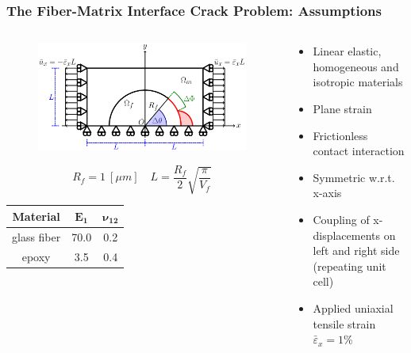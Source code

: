 \documentclass[first,firstsupp,lastsupp,last,hyperref,table]{ETHclass}
\begin{document}
\begin{frame}
\frametitle{\vspace{0.3cm}\small The Fiber-Matrix Interface Crack Problem: Assumptions}
\vspace{-1.cm}
\centering
\begin{columns}
\begin{column}{0.6\textwidth}
\begin{figure}
\includegraphics[width=0.95\columnwidth]{RUC.pdf}
\end{figure}
\vspace{-0.1cm}
\scriptsize
\begin{equation*}
R_{f}=1\ \left[\mu m\right]\quad L=\frac{R_{f}}{2}\sqrt{\frac{\pi}{V_{f}}}
\end{equation*}
\vspace{-0.25cm}
\begin{table}[htbp]
\scriptsize
  \centering
    \begin{tabular}{ccc}
    \toprule
    \textbf{Material} & $\mathbf{E_{1}}$ &$\mathbf{\nu_{12}}$ \\
    \midrule
    glass fiber    & 70.0  & 0.2\\
    epoxy    & 3.5    & 0.4\\
    \bottomrule
    \end{tabular}
\end{table}
\end{column}
\begin{column}{0.4\textwidth}
\scriptsize
\begin{itemize}[label=]
\item Linear elastic, homogeneous and isotropic materials
\item Plane strain
\item Frictionless contact interaction
\item Symmetric w.r.t. x-axis
\item Coupling of x-displacements on left and right side (repeating unit cell)
\item Applied uniaxial tensile strain $\bar{\varepsilon}_{x}=1\%$
\end{itemize}
\end{column}
\end{columns}
\end{frame}
\end{document}
